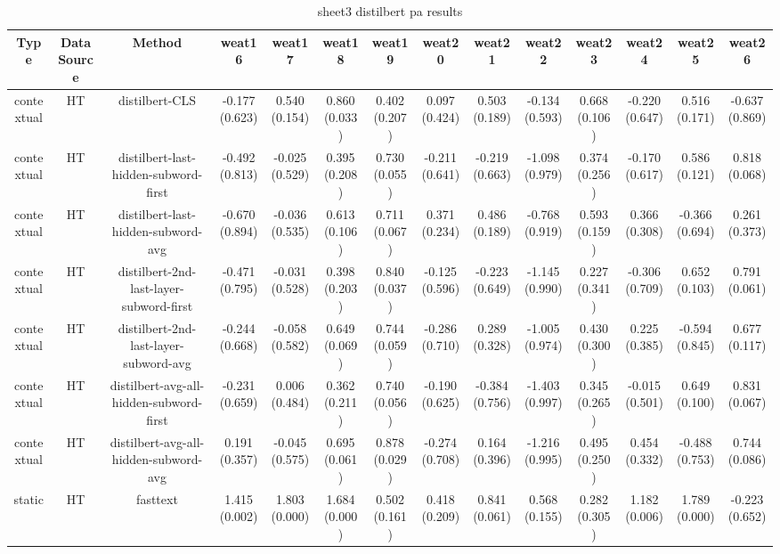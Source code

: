 \begin{sidewaystable}[htb]
    \centering
    \caption{sheet3 distilbert pa results}
    \label{appendix_tab:sheet3_distilbert_pa_results}
    \small
    \begin{tabular}{@{}cccccccccccccc@{}}
        \toprule
        Type & DataSource & Method & weat16 & weat17 & weat18 & weat19 & weat20 & weat21 & weat22 & weat23 & weat24 & weat25 & weat26 \\
        \midrule
        contextual & HT & distilbert-CLS & -0.177 (0.623) & 0.540 (0.154) & 0.860 (0.033) & 0.402 (0.207) & 0.097 (0.424) & 0.503 (0.189) & -0.134 (0.593) & 0.668 (0.106) & -0.220 (0.647) & 0.516 (0.171) & -0.637 (0.869) \\
        contextual & HT & distilbert-last-hidden-subword-first & -0.492 (0.813) & -0.025 (0.529) & 0.395 (0.208) & 0.730 (0.055) & -0.211 (0.641) & -0.219 (0.663) & -1.098 (0.979) & 0.374 (0.256) & -0.170 (0.617) & 0.586 (0.121) & 0.818 (0.068) \\
        contextual & HT & distilbert-last-hidden-subword-avg & -0.670 (0.894) & -0.036 (0.535) & 0.613 (0.106) & 0.711 (0.067) & 0.371 (0.234) & 0.486 (0.189) & -0.768 (0.919) & 0.593 (0.159) & 0.366 (0.308) & -0.366 (0.694) & 0.261 (0.373) \\
        contextual & HT & distilbert-2nd-last-layer-subword-first & -0.471 (0.795) & -0.031 (0.528) & 0.398 (0.203) & 0.840 (0.037) & -0.125 (0.596) & -0.223 (0.649) & -1.145 (0.990) & 0.227 (0.341) & -0.306 (0.709) & 0.652 (0.103) & 0.791 (0.061) \\
        contextual & HT & distilbert-2nd-last-layer-subword-avg & -0.244 (0.668) & -0.058 (0.582) & 0.649 (0.069) & 0.744 (0.059) & -0.286 (0.710) & 0.289 (0.328) & -1.005 (0.974) & 0.430 (0.300) & 0.225 (0.385) & -0.594 (0.845) & 0.677 (0.117) \\
        contextual & HT & distilbert-avg-all-hidden-subword-first & -0.231 (0.659) & 0.006 (0.484) & 0.362 (0.211) & 0.740 (0.056) & -0.190 (0.625) & -0.384 (0.756) & -1.403 (0.997) & 0.345 (0.265) & -0.015 (0.501) & 0.649 (0.100) & 0.831 (0.067) \\
        contextual & HT & distilbert-avg-all-hidden-subword-avg & 0.191 (0.357) & -0.045 (0.575) & 0.695 (0.061) & 0.878 (0.029) & -0.274 (0.708) & 0.164 (0.396) & -1.216 (0.995) & 0.495 (0.250) & 0.454 (0.332) & -0.488 (0.753) & 0.744 (0.086) \\
        static & HT & fasttext & 1.415 (0.002) & 1.803 (0.000) & 1.684 (0.000) & 0.502 (0.161) & 0.418 (0.209) & 0.841 (0.061) & 0.568 (0.155) & 0.282 (0.305) & 1.182 (0.006) & 1.789 (0.000) & -0.223 (0.652) \\

\end{tabular}
\end{sidewaystable}
